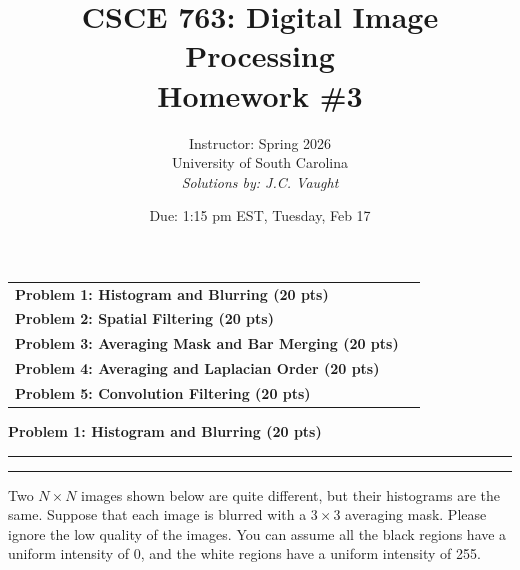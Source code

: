 \documentclass[12pt]{article}
\title{CSCE 763: Digital Image Processing \\ Homework \#3}
\author{Instructor: Spring 2026 \\ University of South Carolina \\ \textit{Solutions by: J.C. Vaught}}
\date{Due: 1:15 pm EST, Tuesday, Feb 17}
\newcommand{\question}[1]{%
  \clearpage
  \vspace{0.5cm}
  {\noindent\normalsize \textbf{#1}}
  \vspace{0.2cm}
  \hrule
  \vspace{0.1cm}
  \hrule
  \vspace{0.3cm}
}
\begin{document}
\maketitle
\setlength{\parindent}{0pt}



\begin{center}
\begin{tcolorbox}[colback=white, colframe=gray!50!black, colbacktitle=gray!20!white,
                  coltitle=black, sharp corners, boxrule=1pt,
                  title=\Large\bfseries Table of Contents]
\begin{tabular}{p{}r}
\textbf{Problem 1: Histogram and Blurring (20 pts)} \dotfill & \textbf{\pageref{quest:1}} \\[0.3em]
\textbf{Problem 2: Spatial Filtering (20 pts)} \dotfill & \textbf{\pageref{quest:2}} \\[0.3em]
\textbf{Problem 3: Averaging Mask and Bar Merging (20 pts)} \dotfill & \textbf{\pageref{quest:3}} \\[0.3em]
\textbf{Problem 4: Averaging and Laplacian Order (20 pts)} \dotfill & \textbf{\pageref{quest:4}} \\[0.3em]
\textbf{Problem 5: Convolution Filtering (20 pts)} \dotfill & \textbf{\pageref{quest:5}} \\
\end{tabular}
\vspace{0.2cm}
\end{tcolorbox}
\end{center}

\vspace{0.5cm}


\question{Problem 1: Histogram and Blurring (20 pts)}\label{quest:1}

Two $N \times N$ images shown below are quite different, but their histograms are the same. Suppose that each image is blurred with a $3 \times 3$ averaging mask. Please ignore the low quality of the images. You can assume all the black regions have a uniform intensity of 0, and the white regions have a uniform intensity of 255.
\end{document}
